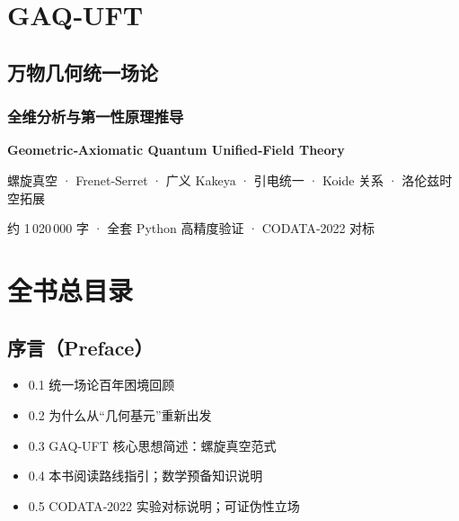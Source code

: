 \centering

\section{GAQ‑UFT}\label{gaquft}

\subsection{万物几何统一场论}\label{ux4e07ux7269ux51e0ux4f55ux7edfux4e00ux573aux8bba}

\subsubsection{全维分析与第一性原理推导}\label{ux5168ux7ef4ux5206ux6790ux4e0eux7b2cux4e00ux6027ux539fux7406ux63a8ux5bfc}

\vspace{1.5cm}

\textbf{Geometric‑Axiomatic Quantum Unified‑Field Theory}

\vspace{2cm}

螺旋真空 · Frenet‑Serret · 广义 Kakeya · 引电统一 · Koide 关系 ·
洛伦兹时空拓展

\vspace{1.5cm}

约 1\,020\,000 字 · 全套 Python 高精度验证 · CODATA‑2022 对标

\clearpage

\section{全书总目录}\label{ux5168ux4e66ux603bux76eeux5f55}

\subsection{序言（Preface）}\label{ux5e8fux8a00preface}

\begin{itemize}
\tightlist
\item
  0.1 统一场论百年困境回顾
\item
  0.2 为什么从``几何基元''重新出发
\item
  0.3 GAQ‑UFT 核心思想简述：螺旋真空范式
\item
  0.4 本书阅读路线指引；数学预备知识说明
\item
  0.5 CODATA‑2022 实验对标说明；可证伪性立场
\end{itemize}

